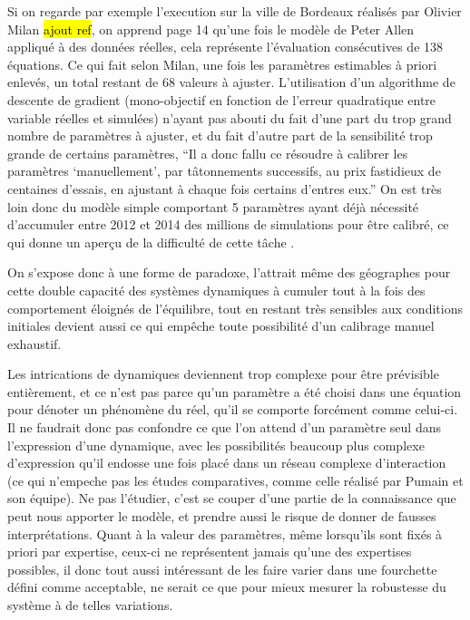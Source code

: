 Si on regarde par exemple l'execution sur la ville de Bordeaux réalisés par Olivier Milan \hl{ajout ref}, on apprend page 14 qu'une fois le modèle de Peter Allen appliqué à des données réelles, cela représente l'évaluation consécutives de 138 équations. Ce qui fait selon Milan, une fois les paramètres estimables à priori enlevés, un total restant de 68 valeurs à ajuster. L'utilisation d'un algorithme de descente de gradient (mono-objectif en fonction de l'erreur quadratique entre variable réelles et simulées) n'ayant pas abouti du fait d'une part du trop grand nombre de paramètres à ajuster, et du fait d'autre part de la sensibilité trop grande de certains paramètres, \enquote{Il a donc fallu ce résoudre à calibrer les paramètres \enquote{manuellement}, par tâtonnements successifs, au prix fastidieux de centaines d'essais, en ajustant à chaque fois certains d'entres eux.}  On est très loin donc du modèle simple comportant 5 paramètres ayant déjà nécessité d'accumuler entre 2012 et 2014 des millions de simulations pour être calibré, ce qui donne un aperçu de la difficulté de cette tâche \autocite{Schmitt2015}.

On s'expose donc à une forme de paradoxe, l'attrait même des géographes pour cette double capacité des systèmes dynamiques à cumuler tout à la fois des comportement éloignés de l'équilibre, tout en restant très sensibles aux conditions initiales devient aussi ce qui empêche toute possibilité d'un calibrage manuel exhaustif.

Les intrications de dynamiques deviennent trop complexe pour être prévisible entièrement, et ce n'est pas parce qu'un paramètre a été choisi dans une équation pour dénoter un phénomène du réel, qu'il se comporte forcément comme celui-ci. Il ne faudrait donc pas confondre ce que l'on attend d'un paramètre seul dans l'expression d'une dynamique, avec les possibilités beaucoup plus complexe d'expression qu'il endosse une fois placé dans un réseau complexe d'interaction (ce qui n'empeche pas les études comparatives, comme celle réalisé par Pumain et son équipe). Ne pas l'étudier, c'est se couper d'une partie de la connaissance que peut nous apporter le modèle, et prendre aussi le risque de donner de fausses interprétations. Quant à la valeur des paramètres, même lorsqu'ils sont fixés à priori par expertise, ceux-ci ne représentent jamais qu'une des expertises possibles, il donc tout aussi intéressant de les faire varier dans une fourchette défini comme acceptable, ne serait ce que pour mieux mesurer la robustesse du système à de telles variations.

